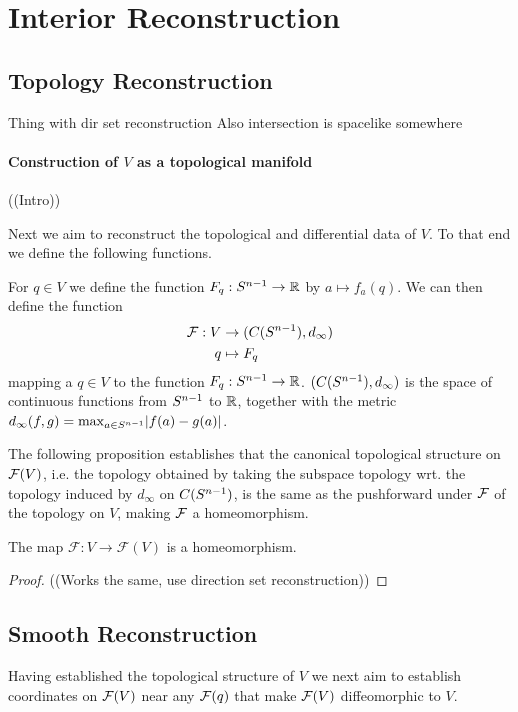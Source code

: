 \chapter{Interior Reconstruction}
\section{Topology Reconstruction}
 
\begin{lemma}
Thing with dir set reconstruction
Also intersection is spacelike somewhere
\end{lemma}




\subsubsection{Construction of $V$ as a topological manifold}
((Intro))

Next we aim to reconstruct the topological and differential data of $V$. To that end we define the following functions.

For $q\in V$ we define the function $F_q:S^{n-1}\to\mathbb{R}$ by $a\mapsto f_a(q)$. We can then define the function 
\begin{align*}
    \mathcal{F}:V &\to (C(S^{n-1}),d_{\infty})\\
    q&\mapsto F_q
\end{align*} mapping a $q\in V$ to the function $F_q:S^{n-1}\to\mathbb{R}$. $(C(S^{n-1}),d_{\infty})$ is the space of continuous functions from $S^{n-1}$ to $\mathbb{R}$, together with the metric $d_\infty(f,g)=\max_{a\in S^{n-1}} \rvert f(a)-g(a) \lvert$.

The following proposition establishes that the canonical topological structure on $\mathcal{F}(V)$, i.e. the topology obtained by taking the subspace topology wrt. the topology induced by $d_\infty$ on $C(S^{n-1})$, is the same as the pushforward under $\mathcal{F}$ of the topology on $V$, making $\mathcal{F}$ a homeomorphism.
\begin{lemma}\label{lem:Fhomeo}
The map $\mathcal{F}:V\to\mathcal{F}(V)$ is a homeomorphism.
\end{lemma}
\begin{proof}
((Works the same, use direction set reconstruction))
\end{proof}


\section{Smooth Reconstruction}
Having established the topological structure of $V$ we next aim to establish coordinates on $\mathcal{F}(V)$ near any $\mathcal{F}(q)$ that make $\mathcal{F}(V)$ diffeomorphic to $V$.

